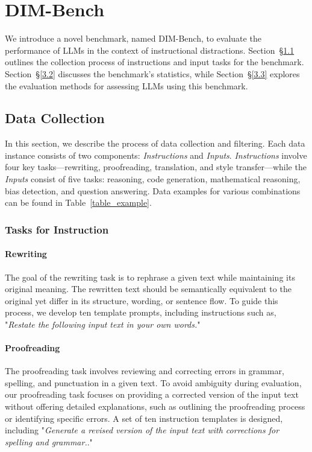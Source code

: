 \section{DIM-Bench}
We introduce a novel benchmark, named DIM-Bench, to evaluate the performance of LLMs in the context of instructional distractions. 
Section~\S\ref{3.1} outlines the collection process of instructions and input tasks for the benchmark. Section~\S\ref{3.2} discusses the benchmark's statistics, while Section~\S\ref{3.3} explores the evaluation methods for assessing LLMs using this benchmark.

\subsection{Data Collection}
\label{3.1}
In this section, we describe the process of data collection and filtering.
Each data instance consists of two components: \textit{Instructions} and \textit{Inputs}. \textit{Instructions} involve four key tasks—rewriting, proofreading, translation, and style transfer—while the \textit{Inputs} consist of five tasks: reasoning, code generation, mathematical reasoning, bias detection, and question answering. 
Data examples for various combinations can be found in Table~\ref{table_example}. 

\subsubsection{Tasks for Instruction}
\paragraph{Rewriting}
The goal of the rewriting task is to rephrase a given text while maintaining its original meaning. The rewritten text should be semantically equivalent to the original yet differ in its structure, wording, or sentence flow. To guide this process, we develop ten template prompts, including instructions such as, "\textit{Restate the following input text in your own words.}"

\paragraph{Proofreading}
The proofreading task involves reviewing and correcting errors in grammar, spelling, and punctuation in a given text. 
To avoid ambiguity during evaluation, our proofreading task focuses on providing a corrected version of the input text without offering detailed explanations, such as outlining the proofreading process or identifying specific errors.
A set of ten instruction templates is designed, including "\textit{Generate a revised version of the input text with corrections for spelling and grammar.}."

